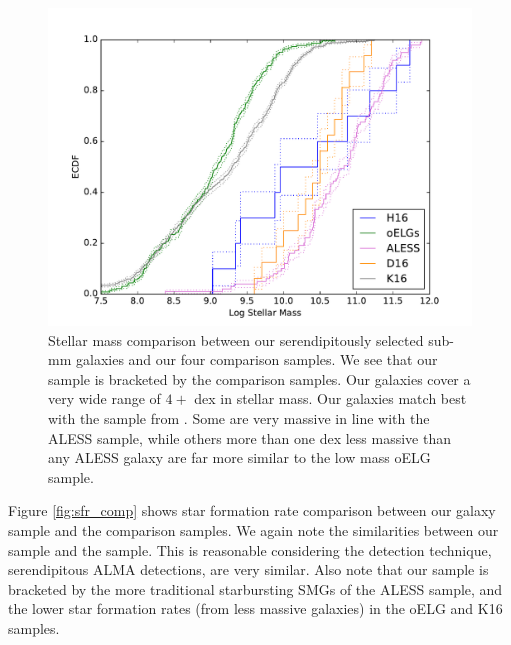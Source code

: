 \documentclass[preprint,natbib209]{aastex}
\begin{document}
\begin{figure}[t]
\centering
\includegraphics[scale=0.8]{ecdf_mass.pdf}
\caption{Stellar mass comparison between our serendipitously selected sub-mm galaxies and our four comparison samples. We see that our sample is bracketed by the comparison samples. Our galaxies cover a very wide range of $4+$ dex in stellar mass. Our galaxies match best with the sample from \cite{dunlop16}. Some are very massive in line with the ALESS sample, while others more than one dex less massive than any ALESS galaxy are far more similar to the low mass oELG sample.}
\label{fig:mass_comp}
\end{figure}

Figure \ref{fig:sfr_comp} shows star formation rate comparison between our galaxy sample and the comparison samples. We again note the similarities between our sample and the \cite{dunlop16} sample. This is reasonable considering the detection technique, serendipitous ALMA detections, are very similar. Also note that our sample is bracketed by the more traditional starbursting SMGs of the ALESS sample, and the lower star formation rates (from less massive galaxies) in the oELG and K16 samples.
\end{document}
